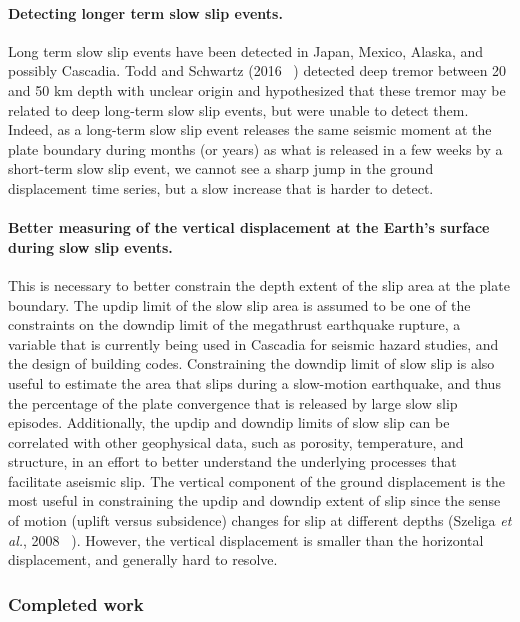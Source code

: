 \documentclass[letterpaper, 12pt]{article}
\begin{document}
\paragraph{Detecting longer term slow slip events.} Long term slow slip events have been detected in Japan, Mexico, Alaska, and possibly Cascadia. Todd and Schwartz (2016 ~\cite{TOD_2016}) detected deep tremor between 20 and 50 km depth with unclear origin and hypothesized that these tremor may be related to deep long-term slow slip events, but were unable to detect them. Indeed, as a long-term slow slip event releases the same seismic moment at the plate boundary during months (or years) as what is released in a few weeks by a short-term slow slip event, we cannot see a sharp jump in the ground displacement time series, but a slow increase that is harder to detect.

\paragraph{Better measuring of the vertical displacement at the Earth's surface during slow slip events.} This is necessary to better constrain the depth extent of the slip area at the plate boundary. The updip limit of the slow slip area is assumed to be one of the constraints on the downdip limit of the megathrust earthquake rupture, a variable that is currently being used in Cascadia for seismic hazard studies, and the design of building codes. Constraining the downdip limit of slow slip is also useful to estimate the area that slips during a slow-motion earthquake, and thus the percentage of the plate convergence that is released by large slow slip episodes. Additionally, the updip and downdip limits of slow slip can be correlated with other geophysical data, such as porosity, temperature, and structure, in an effort to better understand the underlying processes that facilitate aseismic slip. The vertical component of the ground displacement is the most useful in constraining the updip and downdip extent of slip since the sense of motion (uplift versus subsidence) changes for slip at different depths (Szeliga \textit{et al.}, 2008 ~\cite{SZE_2008}). However, the vertical displacement is smaller than the horizontal displacement, and generally hard to resolve.

\subsubsection*{Completed work}
\end{document}
